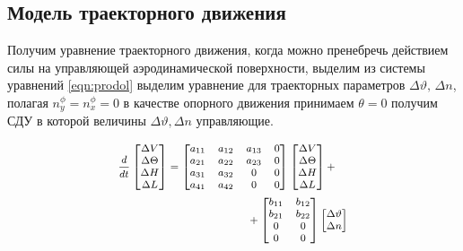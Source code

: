 \documentclass{article}
\begin{document}
\subsection{Модель траекторного движения}
Получим уравнение траекторного движения, когда можно пренебречь действием силы
на управляющей аэродинамической поверхности, выделим из системы уравнений
\eqref{eqn:prodol} выделим уравнение для траекторных параметров $\Delta
\vartheta, \, \Delta n$, полагая $n_y^\phi = n_x^\phi = 0$ в качестве опорного
движения принимаем $\theta=0$ получим СДУ в которой величины $\Delta \vartheta,
\Delta n$ управляющие.


\begin{equation}
    \medmath{
        \begin{multlined}
            \frac{d}{dt}
            \begin{bmatrix}
                \Delta V      \\
                \Delta \Theta \\
                \Delta H      \\
                \Delta L
            \end{bmatrix}
            =
            \begin{bmatrix}
                a_{11} & a_{12} & a_{13} & 0 \\
                a_{21} & a_{22} & a_{23} & 0 \\
                a_{31} & a_{32} & 0      & 0 \\
                a_{41} & a_{42} & 0      & 0 \\
            \end{bmatrix}
            \begin{bmatrix}
                \Delta V      \\
                \Delta \Theta \\
                \Delta H      \\
                \Delta L
            \end{bmatrix}
            + \\
            +
            \begin{bmatrix}
                b_{11} & b_{12} \\
                b_{21} & b_{22} \\
                0      & 0      \\
                0      & 0      \\
            \end{bmatrix}
            \begin{bmatrix}
                \Delta \vartheta \\
                \Delta n         \\
            \end{bmatrix}
        \end{multlined}
    }
\end{equation}
\end{document}
